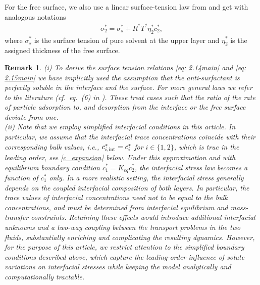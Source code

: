 \documentclass[11pt]{article}
\numberwithin{equation}{section}
\newtheorem{counter example}[theorem]{Counter Example}
\newtheorem{remark}[theorem] {Remark}
\begin{document}
{For the free surface, we also use a  linear surface-tension law from \cite{barthwal2023construction,conn2016fluid} and get with analogous notations
\begin{align}\label{eq: 2.15main}
\sigma_2^*=\sigma_{s}^*+R^*T^*\eta_2^* c_2^*,
\end{align}
where $\sigma_s^*$ is the surface tension of pure solvent at the upper layer and $\eta_2^*$ is the assigned thickness of the free surface.
\begin{remark}
(i) To derive the surface tension relations \eqref{eq: 2.14main}  and \eqref{eq: 2.15main} we have implicitly used the assumption that the anti-surfactant is perfectly soluble in the interface and the surface. For more  general laws we refer to the literature  (cf.~eq.~(6) in  \cite{conn2016fluid}). These treat cases such that 
the ratio of the rate of particle adsorption to, and desorption from the interface or the free surface deviate from one.\\ 
(ii) Note that we employ simplified interfacial conditions in this article. In particular, we assume that the interfacial trace concentrations coincide with their corresponding bulk values, i.e., $c_{i, \rm{int}}^*=c_i^*$ for $i\in \{1, 2\}$, which is true in the leading order, see \eqref{c_expansion} below. Under this approximation and with  equilibrium boundary condition $c_1^*=K_{eq}c_2^*$, the interfacial stress law becomes a function of $c_1^*$ only. In a more realistic setting, the interfacial stress generally depends on the coupled interfacial composition of both layers. In particular, the trace values of interfacial concentrations need not to be equal to the bulk concentrations, and must be determined from interfacial equilibrium and mass-transfer constraints. Retaining these effects would introduce additional interfacial unknowns and a two-way coupling between the transport problems in the two fluids, substantially enriching and complicating the resulting dynamics. However, for the purpose of this article, we restrict attention to the simplified boundary conditions described above, which capture the leading-order influence of solute variations on interfacial stresses while keeping the model analytically and computationally tractable.
\end{remark}
}
\end{document}
